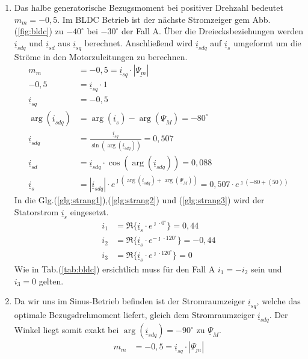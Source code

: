 \begin{solution}
\begin{enumerate}
\item Das halbe generatorische Bezugsmoment bei positiver Drehzahl bedeutet $m_m = -0,5$. Im BLDC Betrieb ist der nächste Stromzeiger gem Abb.(\ref{fig:bldc}) zu $-40^\circ$ bei $-30^\circ$ der Fall A. Über die Dreiecksbeziehungen werden $\underline{i}_{sdq}$ und $\underline{i}_{sd}$ aus $\underline{i}_{sq}$ berechnet. Anschließend wird $\underline{i}_{sdq}$ auf $\underline{i}_{s}$ umgeformt um die Ströme in den Motorzuleitungen zu berechnen.
\begin{align}
m_m &= -0,5 = \underline{i}_{sq} \cdot |\underline{\Psi_m}|\\
-0,5 &= \underline{i}_{sq} \cdot 1\\
\underline{i}_{sq} &= -0,5\\
\arg(\underline{i}_{sdq}) &= \arg(\underline{i}_{s}) -\arg(\underline{\Psi}_{M})=-80^\circ\\
\underline{i}_{sdq} &= \frac{\underline{i}_{sq}}{\sin(\arg(\underline{i}_{sdq}))}= 0,507\\
\underline{i}_{sd} &= \underline{i}_{sdq} \cdot \cos(\arg(\underline{i}_{sdq})) = 0,088\\
\underline{i}_{s} &= |\underline{i}_{sdq}| \cdot e^{\jmath (\arg(\underline{i}_{sdq}) + \arg(\underline{\Psi}_{M}))}= 0,507 \cdot e^{\jmath ( -80 + (50))}
\end{align}
In die Glg.(\ref{glg:strang1}),(\ref{glg:strang2}) und (\ref{glg:strang3}) wird der Statorstrom $\underline{i}_s$ eingesetzt.
\begin{align}
i_1 & = \Re \{ \underline{i}_s \cdot e^{\jmath \cdot 0 ^\circ} \} = 0,44\\
i_2 & = \Re \{ \underline{i}_s \cdot e^{-\jmath \cdot 120 ^\circ} \} = -0,44 \\
i_3 & = \Re \{ \underline{i}_s \cdot e^{\jmath \cdot 120 ^\circ} \}=  0
\end{align}
Wie in Tab.(\ref{tab:bldc}) ersichtlich muss für den Fall A $i_1= -i_2$ sein und $i_3= 0$ gelten.
\item Da wir uns im Sinus-Betrieb befinden ist der Stromraumzeiger $\underline{i}_{sq}$, welche das optimale Bezugsdrehmoment liefert, gleich dem Stromraumzeiger $\underline{i}_{sdq}$. Der Winkel liegt somit exakt bei $\arg(\underline{i}_{sdq})=-90^\circ$ zu $\underline{\Psi}_M$.
\begin{align}
m_m &= -0,5 = \underline{i}_{sq} \cdot |\underline{\Psi_m}|\\

\end{align}
\end{enumerate}
\end{solution}
